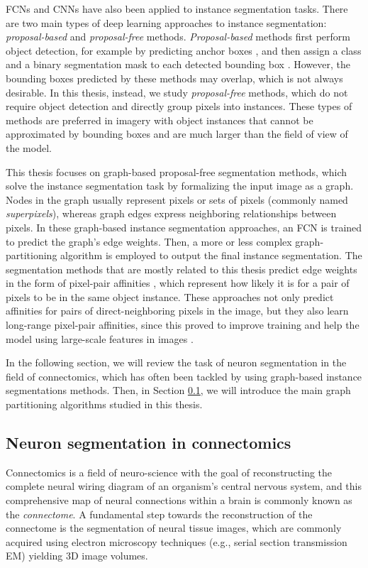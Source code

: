 FCNs and CNNs have also been applied to instance segmentation tasks.
There are two main types of deep learning approaches to instance segmentation: \emph{proposal-based} and \emph{proposal-free} methods. 
\emph{Proposal-based} methods first perform object detection, for example by predicting anchor boxes \cite{ren2015faster}, and then assign a class and a binary segmentation mask to each detected bounding box \cite{he2017mask,porzi2019seamless}.
However, the bounding boxes predicted by these methods may overlap, which is not always desirable. 
In this thesis, instead, we study \emph{proposal-free} methods, which do not require object detection and directly group pixels into instances. 
These types of methods are preferred in imagery with object instances that cannot be approximated by bounding boxes and are much larger than the field of view of the model. 

This thesis focuses on graph-based proposal-free segmentation methods, which solve the instance segmentation task by formalizing the input image as a graph. Nodes in the graph usually represent pixels or sets of pixels (commonly named \emph{superpixels}), whereas graph edges express neighboring relationships between pixels. In these graph-based instance segmentation approaches, an FCN is trained to predict the graph's edge weights. Then, a more or less complex graph-partitioning algorithm is employed to output the final instance segmentation. 
The segmentation methods that are mostly related to this thesis predict edge weights in the form of pixel-pair affinities \cite{Gao_2019_ICCV,liu2018affinity,lee2017superhuman}, which represent how likely it is for a pair of pixels to be in the same object instance. These approaches not only predict affinities for pairs of direct-neighboring pixels in the image, but they also learn long-range pixel-pair affinities, since this proved to improve training and help the model using large-scale features in images \cite{lee2017superhuman}.

In the following section, we will review the task of neuron segmentation in the field of connectomics, which has often been tackled by using graph-based instance segmentations methods. Then, in Section \ref{}, we will introduce the main graph partitioning algorithms studied in this thesis.



 
\subsection{Neuron segmentation in connectomics}
Connectomics is a field of neuro-science with the goal of reconstructing the complete neural wiring diagram of an organism's central nervous system, and this comprehensive map of neural connections within a brain is commonly known as the \emph{connectome}. A fundamental step towards the reconstruction of the connectome is the segmentation of neural tissue images, which are commonly acquired using electron microscopy techniques (e.g., serial section transmission EM) yielding 3D image volumes. 

